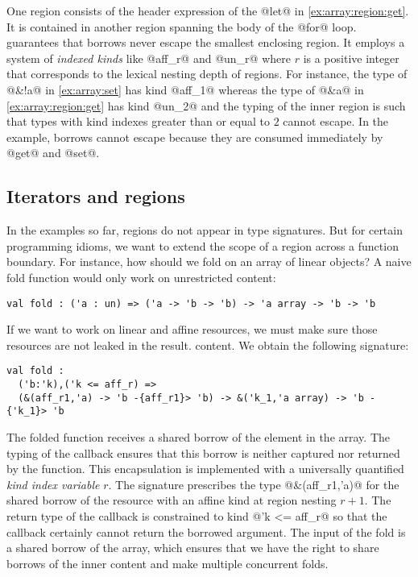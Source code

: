 One region consists of the header expression of the @let@ in
\cref{ex:array:region:get}. It is contained in another region
spanning the body of the @for@ loop. \lang guarantees that borrows
never escape the smallest enclosing region. It employs a system of
\emph{indexed kinds} like @aff_r@ and @un_r@ where
$r$ is a positive integer that corresponds to the lexical nesting
depth of regions. For instance, the type of @&!a@ in
\cref{ex:array:set} has kind @aff_1@ whereas the type of
@&a@ in \cref{ex:array:region:get} has kind
@un_2@ and the typing of the inner region is such that types with
kind indexes greater than or equal to $2$ cannot escape.
In the example, borrows cannot escape  because they are consumed
immediately by @get@ and @set@.



\subsection{Iterators and regions}
\label{tuto:vector}

In the examples so far, regions do not appear in type signatures.
But for certain programming idioms, we want to extend the scope of a
region across a function boundary.
For instance, how should we fold on an array of linear objects?
A naive fold function would only work on unrestricted content:
\begin{lstlisting}
val fold : ('a : un) => ('a -> 'b -> 'b) -> 'a array -> 'b -> 'b
\end{lstlisting}

If we want to work on linear and affine resources,
we must make sure those resources are not leaked in the result.
content. We obtain the following signature:
\begin{lstlisting}
val fold :
  ('b:'k),('k <= aff_r) =>
  (&(aff_r1,'a) -> 'b -{aff_r1}> 'b) -> &('k_1,'a array) -> 'b -{'k_1}> 'b
\end{lstlisting}

The folded function receives a shared borrow of the element in the array.
The typing of the callback ensures
that this borrow is neither captured nor returned by the function.
%
This encapsulation is implemented with a universally quantified \emph{kind index variable} $r$.
The signature prescribes the type @&(aff_r1,'a)@ for the
shared borrow of the resource with an affine kind at region nesting $r+1$. The return
type of the callback is constrained to kind @'k <= aff_r@
so that the callback certainly cannot return the borrowed argument.
%
The input of the fold is a shared borrow of the array,
which ensures that we have the right to share borrows of the inner content and
make multiple concurrent folds.

